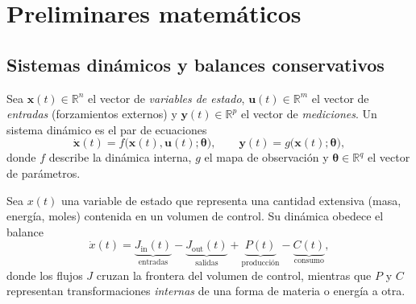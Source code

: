 \section{Preliminares matemáticos}

\subsection{Sistemas dinámicos y balances conservativos}

\begin{definition}\label{def11}
Sea $\mathbf{x}(t) \in \mathbb{R}^n$ el vector de \emph{variables de estado},
$\mathbf{u}(t) \in \mathbb{R}^m$ el vector de \emph{entradas} (forzamientos externos)
y $\mathbf{y}(t) \in \mathbb{R}^p$ el vector de \emph{mediciones}. Un sistema dinámico
es el par de ecuaciones
\begin{equation}
\dot{\mathbf{x}}(t) = f\bigl(\mathbf{x}(t), \mathbf{u}(t); \boldsymbol{\theta}\bigr),
\qquad
\mathbf{y}(t) = g\bigl(\mathbf{x}(t); \boldsymbol{\theta}\bigr),
\label{eq:sistema-general}
\end{equation}
donde $f$ describe la dinámica interna, $g$ el mapa de observación y
$\boldsymbol{\theta} \in \mathbb{R}^q$ el vector de parámetros.
\end{definition}

\begin{definition}\label{def12}
Sea $x(t)$ una variable de estado que representa una cantidad extensiva
(masa, energía, moles) contenida en un volumen de control. Su dinámica
obedece el balance
\begin{equation}
\dot{x}(t) = \underbrace{J_{\mathrm{in}}(t)}_{\text{entradas}}
- \underbrace{J_{\mathrm{out}}(t)}_{\text{salidas}}
+ \underbrace{P(t)}_{\text{producción}}
- \underbrace{C(t)}_{\text{consumo}},
\label{eq:balance}
\end{equation}
donde los flujos $J$ cruzan la frontera del volumen de control, mientras que
$P$ y $C$ representan transformaciones \emph{internas} de una forma de materia
o energía a otra.
\end{definition}

